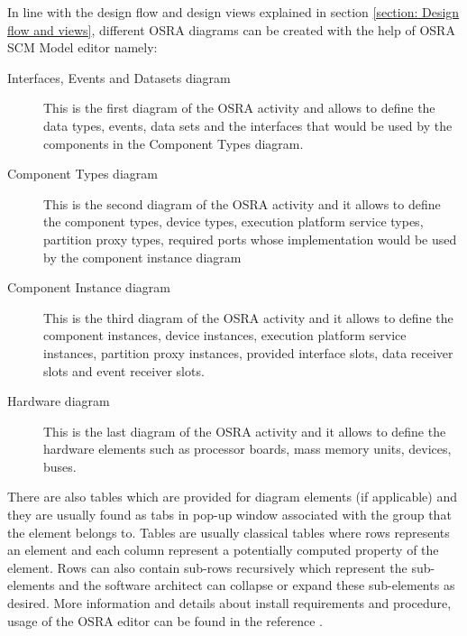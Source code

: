 In line with the design flow and design views explained in section \cref{section: Design flow and views}, different OSRA diagrams can be created with the help of OSRA SCM Model editor namely:
\begin{description}
\item [Interfaces, Events and Datasets diagram] This is the first diagram of the OSRA activity and allows to define the data types, events, data sets and the interfaces that would be used by the components in the Component Types diagram.
\item [Component Types diagram] This is the second diagram of the OSRA activity and it allows to define the component types, device types, execution platform service types, partition proxy types, required ports whose implementation would be used by the component instance diagram
\item [Component Instance diagram] This is the third diagram of the OSRA activity and it allows to define the component instances, device instances, execution platform service instances, partition proxy instances, provided interface slots, data receiver slots and event receiver slots.
\item [Hardware diagram] This is the last diagram of the OSRA activity and it allows to define the hardware elements such as processor boards, mass memory units, devices, buses.
\end{description}

There are also tables which are provided for diagram elements (if applicable) and they are usually found as tabs in pop-up window associated with the group that the element belongs to. Tables are usually classical tables where rows represents an element and each column represent a potentially computed property of the element. Rows can also contain sub-rows recursively which represent the sub-elements and the software architect can collapse or expand these sub-elements as desired. More information and details about install requirements and procedure, usage of the OSRA editor can be found in the reference \cite{OSRAEditor}.    
    

  